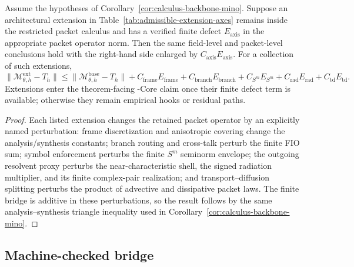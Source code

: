 \begin{lemma}
\label{lem:extension-budget-bookkeeping}
Assume the hypotheses of Corollary~\ref{cor:calculus-backbone-mino}.  Suppose an architectural extension in Table~\ref{tab:admissible-extension-axes} remains inside the restricted packet calculus and has a verified finite defect $E_{\mathrm{axis}}$ in the appropriate packet operator norm.  Then the same field-level and packet-level conclusions hold with the right-hand side enlarged by $C_{\mathrm{axis}}E_{\mathrm{axis}}$.  For a collection of such extensions,
\[
\|\mathcal M_{\theta,h}^{\mathrm{ext}}-T_h\|
\le
\|\mathcal M_{\theta,h}^{\mathrm{base}}-T_h\|
+C_{\mathrm{frame}}E_{\mathrm{frame}}
+C_{\mathrm{branch}}E_{\mathrm{branch}}
+C_{S^m}E_{S^m}
+C_{\mathrm{rad}}E_{\mathrm{rad}}
+C_{\mathrm{td}}E_{\mathrm{td}} .
\]
Extensions enter the theorem-facing \MiNO-Core claim once their finite defect term is available; otherwise they remain empirical hooks or residual paths.
\end{lemma}

\begin{proof}
Each listed extension changes the retained packet operator by an explicitly named perturbation: frame discretization and anisotropic covering change the analysis/synthesis constants; branch routing and cross-talk perturb the finite FIO sum; symbol enforcement perturbs the finite $S^m$ seminorm envelope; the outgoing resolvent proxy perturbs the near-characteristic shell, the signed radiation multiplier, and its finite complex-pair realization; and transport--diffusion splitting perturbs the product of advective and dissipative packet laws.  The finite bridge is additive in these perturbations, so the result follows by the same analysis--synthesis triangle inequality used in Corollary~\ref{cor:calculus-backbone-mino}.
\end{proof}

\subsection{Machine-checked bridge}

